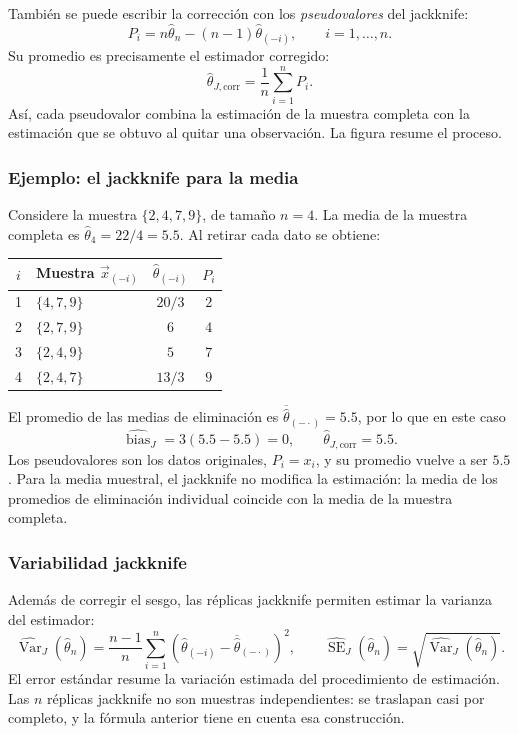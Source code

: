 También se puede escribir la corrección con los \emph{pseudovalores} del
jackknife:
\[
    P_i=n\widehat\theta_n-(n-1)\widehat\theta_{(-i)},
    \qquad i=1,\ldots,n.
\]
Su promedio es precisamente el estimador corregido:
\[
    \widehat\theta_{J,\mathrm{corr}}
    =\frac{1}{n}\sum_{i=1}^{n}P_i.
\]
Así, cada pseudovalor combina la estimación de la muestra completa con la
estimación que se obtuvo al quitar una observación. La figura resume el
proceso.



\subsubsection{Ejemplo: el jackknife para la media}

Considere la muestra $\{2,4,7,9\}$, de tamaño $n=4$. La media de la muestra
completa es $\widehat\theta_4=22/4=5.5$. Al retirar cada dato se obtiene:
\begin{center}
\begin{tabularx}{0.92\linewidth}{@{}cXcc@{}}
    \toprule
    $i$ & Muestra $\vec{x}_{(-i)}$ & $\widehat\theta_{(-i)}$ & $P_i$\\
    \midrule
    1 & $\{4,7,9\}$ & $20/3$ & $2$\\
    2 & $\{2,7,9\}$ & $6$ & $4$\\
    3 & $\{2,4,9\}$ & $5$ & $7$\\
    4 & $\{2,4,7\}$ & $13/3$ & $9$\\
    \bottomrule
\end{tabularx}
\end{center}
El promedio de las medias de eliminación es $\overline{\widehat\theta}_{(-\cdot)}=5.5$,
por lo que en este caso
\[
    \widehat{\operatorname{bias}}_{J}=3(5.5-5.5)=0,
    \qquad
    \widehat\theta_{J,\mathrm{corr}}=5.5.
\]
Los pseudovalores son los datos originales, $P_i=x_i$, y su promedio vuelve
a ser $5.5$. Para la media muestral, el jackknife no modifica la estimación:
la media de los promedios de eliminación individual coincide con la media de
la muestra completa.

\subsubsection{Variabilidad jackknife}

Además de corregir el sesgo, las réplicas jackknife permiten estimar la
varianza del estimador:
\[
    \widehat{\operatorname{Var}}_{J}(\widehat\theta_n)
    =\frac{n-1}{n}\sum_{i=1}^{n}
      \left(\widehat\theta_{(-i)}-
      \overline{\widehat\theta}_{(-\cdot)}\right)^2,
    \qquad
    \widehat{\operatorname{SE}}_{J}(\widehat\theta_n)
    =\sqrt{\widehat{\operatorname{Var}}_{J}(\widehat\theta_n)}.
\]
El error estándar resume la variación estimada del procedimiento de
estimación. Las $n$ réplicas jackknife no son muestras independientes: se
traslapan casi por completo, y la fórmula anterior tiene en cuenta esa
construcción.

